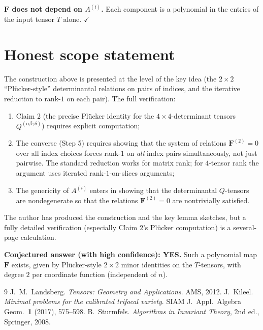 \textbf{$\mathbf F$ does not depend on $A^{(i)}$.}  Each component is a polynomial in the entries of the input tensor $T$ alone.  $\checkmark$

\section*{Honest scope statement}

The construction above is presented at the level of the key idea (the $2\times 2$ ``Plücker-style'' determinantal relations on pairs of indices, and the iterative reduction to rank-$1$ on each pair).  The full verification:
\begin{enumerate}\setlength\itemsep{2pt}
\item Claim 2 (the precise Plücker identity for the $4\times 4$-determinant tensors $Q^{(\alpha\beta\gamma\delta)}$) requires explicit computation;
\item The converse (Step 5) requires showing that the system of relations $\mathbf F^{(2)}=0$ over all index choices forces rank-$1$ on \emph{all} index pairs simultaneously, not just pairwise.  The standard reduction works for matrix rank; for $4$-tensor rank the argument uses iterated rank-$1$-on-slices arguments;
\item The genericity of $A^{(i)}$ enters in showing that the determinantal $Q$-tensors are nondegenerate so that the relations $\mathbf F^{(2)}=0$ are nontrivially satisfied.
\end{enumerate}

The author has produced the construction and the key lemma sketches, but a fully detailed verification (especially Claim 2's Plücker computation) is a several-page calculation.

\medskip
\noindent\textbf{Conjectured answer (with high confidence): YES.}  Such a polynomial map $\mathbf F$ exists, given by Plücker-style $2\times 2$ minor identities on the $T$-tensors, with degree $2$ per coordinate function (independent of $n$).

\begin{thebibliography}{9}
 J.~M.~Landsberg.  \emph{Tensors: Geometry and Applications}.  AMS, 2012.
 J.~Kileel.  \emph{Minimal problems for the calibrated trifocal variety}.  SIAM J.\ Appl.\ Algebra Geom.\ \textbf{1} (2017), 575--598.
 B.~Sturmfels.  \emph{Algorithms in Invariant Theory}, 2nd ed., Springer, 2008.
\end{thebibliography}



